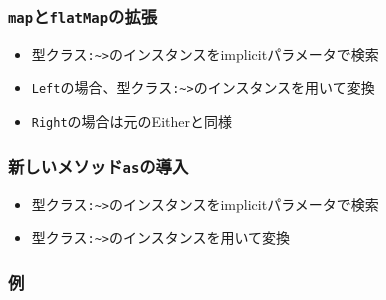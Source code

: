 \begin{frame}[fragile]
  \frametitle{\lstinline|map|と\lstinline|flatMap|の拡張}


  \begin{itemize}
    \item<3-> 型クラス\lstinline|:~>|のインスタンスをimplicitパラメータで検索
    \item<4-> \lstinline|Left|の場合、型クラス\lstinline|:~>|のインスタンスを用いて変換
    \item<5-> \lstinline|Right|の場合は元のEitherと同様
  \end{itemize}
\end{frame}

\begin{frame}[fragile]
  \frametitle{新しいメソッド\lstinline|as|の導入}


  \begin{itemize}
    \item<3-> 型クラス\lstinline|:~>|のインスタンスをimplicitパラメータで検索
    \item<4-> 型クラス\lstinline|:~>|のインスタンスを用いて変換
  \end{itemize}

  \begin{center}

  \end{center}
\end{frame}

\begin{frame}[fragile]
  \frametitle{例}

  \begin{exampleblock}{}
    
  \end{exampleblock}
\end{frame}

